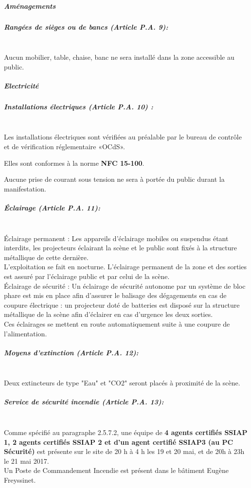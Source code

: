 \documentclass[hidelinks, paper=a4, fontsize=13pt]{report}
\begin{document}
\subparagraph{Aménagements}

\subparagraph*{Rangées de sièges ou de bancs (Article P.A. 9):}\mbox{}\\
Aucun mobilier, table, chaise, banc ne sera installé dans la zone accessible au public.

\subparagraph{Electricité}

\subparagraph*{Installations électriques (Article P.A. 10) :}\mbox{}\\
Les installations électriques sont vérifiées au préalable par le bureau de contrôle et de vérification réglementaire «OCdS». 

Elles sont conformes à la norme \textbf{NFC 15-100}.

Aucune prise de courant sous tension ne sera à portée du public durant la manifestation.

\subparagraph*{Éclairage (Article P.A. 11):}\mbox{}\\
Éclairage permanent : Les appareils d’éclairage mobiles ou suspendus étant interdits, les projecteurs éclairant la scène et le public sont fixés à la structure métallique de cette dernière. \\

L’exploitation se fait en nocturne. L’éclairage permanent de la zone et des sorties est assuré par l’éclairage public et par celui de la scène. \\

Éclairage de sécurité : Un éclairage de sécurité autonome par un système de bloc phare est mis en place afin d’assurer le balisage des dégagements en cas de coupure électrique : un projecteur doté de batteries est disposé sur la structure métallique de la scène afin d’éclairer en cas d’urgence les deux sorties. \\

Ces éclairages se mettent en route automatiquement suite à une coupure de l’alimentation. 

\subparagraph*{Moyens d'extinction (Article P.A. 12):}\mbox{}\\

Deux extincteurs de type "Eau" et "CO2" seront placés à proximité de la scène.

\subparagraph*{Service de sécurité incendie (Article P.A. 13):}\mbox{}\\

Comme spécifié au paragraphe 2.5.7.2, une équipe de \textbf{4 agents certifiés SSIAP 1, 2 agents certifiés SSIAP 2 et d’un agent certifié SSIAP3 (au PC Sécurité)} est présente sur le site de 20 h à 4 h les 19 et 20  mai, et de 20h à 23h le 21 mai 2017. \\
Un Poste de Commandement Incendie est présent dans le bâtiment Eugène Freyssinet. \\
\end{document}
